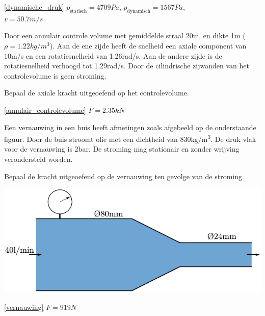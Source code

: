 \begin{antwoord}{\ref{dynamische_druk}}
	$p_{\text{statisch}} = 4709\unit{Pa}$, $p_{\text{dynamisch}} = 1567\unit{Pa}$,\\ $v = 50.7\unit{m/s}$
\end{antwoord}
\begin{toepassing}
	\label{annulair_controlevolume}
Door een annulair controle volume met gemiddelde straal 20m, en dikte 1m ($\rho=1.22\unit{kg/m^3}$). Aan de ene zijde heeft de snelheid een axiale component van 10m/s en een rotatiesnelheid van 1.26rad/s. Aan de andere zijde is de rotatiesnelheid verhoogd tot 1.29rad/s. Door de cilindrische zijwanden van het controlevolume is geen stroming.

Bepaal de axiale kracht uitgeoefend op het controlevolume.
\end{toepassing}
\begin{antwoord}{\ref{annulair_controlevolume}}
	$F = 2.35\unit{kN}$
\end{antwoord}
\begin{toepassing}
	\label{vernauwing}
Een vernauwing in een buis heeft afmetingen zoals afgebeeld op de onderstaande figuur. Door de buis stroomt olie met een dichtheid van 830\unit{kg/m^3}. De druk vlak voor de vernauwing is 2\unit{bar}. De stroming mag stationair en zonder wrijving verondersteld worden.
		
Bepaal de kracht uitgeoefend op de vernauwing ten gevolge van de stroming.

	\centering
	\includegraphics{fig/behoudsvergelijkingen/vernauwing}
\end{toepassing}
\begin{antwoord}{\ref{vernauwing}}
	$F = 919\unit{N}$
\end{antwoord}
